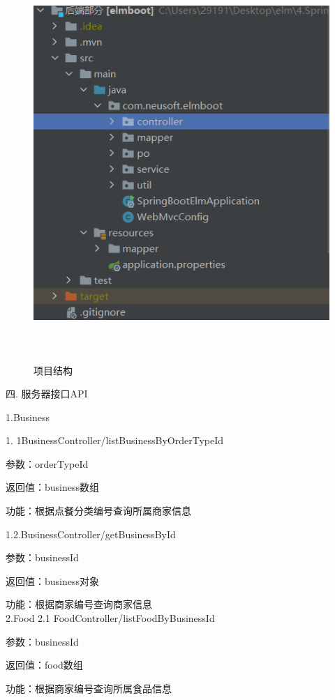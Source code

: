 \begin{figure}[H]
    \centering
    \includegraphics[width=15cm,height=15cm]{figures/structure4.png}
    \caption{项目结构}
\end{figure}

\noindent
四. 服务器接口API

1.Business 

1. 1BusinessController/listBusinessByOrderTypeId 

参数：orderTypeId 

返回值：business数组 

功能：根据点餐分类编号查询所属商家信息 

1.2.BusinessController/getBusinessById 

参数：businessId 

返回值：business对象 

功能：根据商家编号查询商家信息 ~\\

2.Food 
2.1 FoodController/listFoodByBusinessId 

参数：businessId 

返回值：food数组 

功能：根据商家编号查询所属食品信息 ~\\

